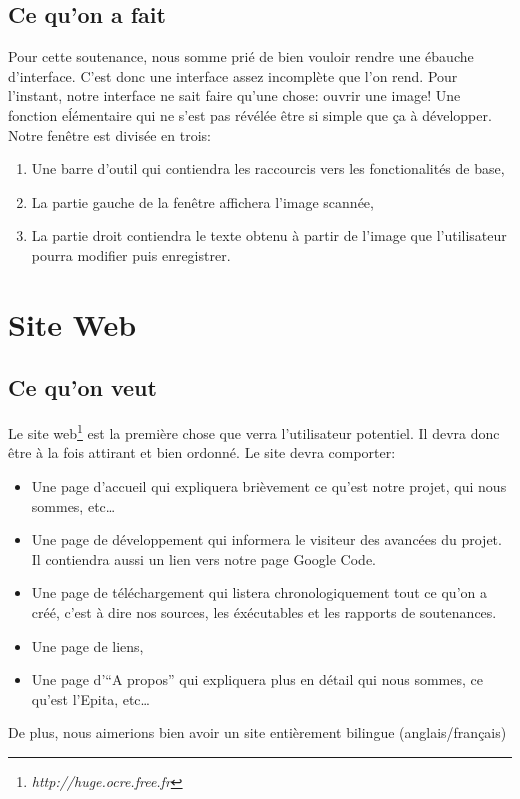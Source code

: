 \documentclass[]{report}
\begin{document}
		\section{Ce qu'on a fait} %
		\label{sec:ce_qu_on_a_fait}
			Pour cette soutenance, nous somme pri\'e de bien vouloir rendre une \'ebauche d'interface. C'est donc une interface assez incompl\`ete que l'on rend. Pour l'instant, notre interface ne sait faire qu'une chose: ouvrir une image! Une fonction e\'l\'ementaire qui ne s'est pas r\'ev\'el\'ee \^etre si simple que \c ca \`a d\'evelopper. Notre fen\^etre est divis\'ee en trois:
			\begin{enumerate}
				\item Une barre d'outil qui contiendra les raccourcis vers les fonctionalit\'es de base,
				\item La partie gauche de la fen\^etre affichera l'image scann\'ee,
				\item La partie droit contiendra le texte obtenu \`a partir de l'image que l'utilisateur pourra modifier puis enregistrer.
			\end{enumerate}
			
			
		
		
		

	\chapter{Site Web} %
	\label{cha:site_web}
		\section{Ce qu'on veut} %
		\label{sec:ce_qu_on_veut}
		Le site web\footnote{\emph{http://huge.ocre.free.fr}} est la premi\`ere chose que verra l'utilisateur potentiel. Il devra donc \^etre \`a la fois attirant et bien ordonn\'e. Le site devra comporter:
		\begin{itemize}
			\item Une page d'accueil qui expliquera bri\`evement ce qu'est notre projet, qui nous sommes, etc\ldots
			\item Une page de d\'eveloppement qui informera le visiteur des avanc\'ees du projet. Il contiendra aussi un lien vers notre page Google Code.
			\item Une page de t\'el\'echargement qui listera chronologiquement tout ce qu'on a cr\'e\'e, c'est \`a dire nos sources, les \'ex\'ecutables et les rapports de soutenances.
			\item Une page de liens,
			\item Une page d'``A propos'' qui expliquera plus en d\'etail qui nous sommes, ce qu'est l'Epita, etc\ldots
		\end{itemize}
		De plus, nous aimerions bien avoir un site enti\`erement bilingue (anglais/fran\c cais)
\end{document}
